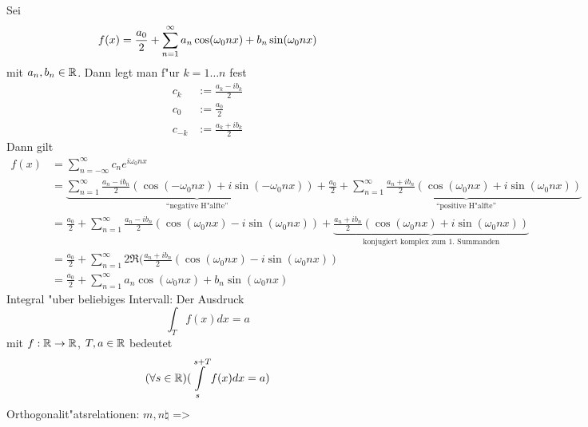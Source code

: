 {
  Sei
  \[
    f(x)=\frac{a_0}2+\sumn 1 a_n \cos(\omega_0 nx) + b_n \sin(\omega_0 nx)
  \]
  mit $a_n,b_n\in\mathbb R$. Dann legt man f"ur $k=1\ldots n$ fest
  \begin{align*}
    c_k&:=\frac{a_k-ib_k}2 \\
    c_0&:=\frac{a_0}2 \\
    c_{-k}&:=\frac{a_k+ib_k}2
  \end{align*}
  Dann gilt
  \begin{align*}
    f(x)&=\sum_{n=-\infty}^\infty c_n e^{i\omega_0 nx} \\
        &=\underbrace{
          \sum_{n=1}^\infty \frac{a_n-ib_n}2 (\cos(-\omega_0 nx)+i\sin(-\omega_0 nx)) +
          }_{\text{``negative H"alfte''}}
          \frac{a_0}2 + 
          \underbrace{
          \sum_{n=1}^\infty \frac{a_n+ib_n}2 (\cos(\omega_0 nx)+i\sin(\omega_0 nx))
          }_{\text{``positive H"alfte''}}\\
        &=\frac{a_0}2 + 
          \sum_{n=1}^\infty 
            \frac{a_n-ib_n}2 (\cos(\omega_0 nx)-i\sin(\omega_0 nx)) +
            \underbrace{\frac{a_n+ib_n}2 (\cos(\omega_0 nx)+i\sin(\omega_0 nx))}
            _{\text{konjugiert komplex zum 1. Summanden}} \\
        &=\frac{a_0}2 + 
          \sum_{n=1}^\infty 2\Re(\frac{a_n+ib_n}2(\cos(\omega_0 nx)-i\sin(\omega_0 nx)) \\
        &=\frac{a_0}2 + 
          \sum_{n=1}^\infty a_n \cos(\omega_0 nx)+b_n\sin(\omega_0 nx)
  \end{align*}
}
 Integral "uber beliebiges Intervall:{
  Der Ausdruck
  \[
    \int_T f(x) dx = a
  \]
  mit $f:\mathbb R\to\mathbb R$, $T,a\in\mathbb R$ bedeutet
  \[
    (\forall s\real)(\int_s^{s+T} f(x) dx = a)
  \]
}
\theorem Orthogonalit"atsrelationen:
  $m,n\natural$
  =>

